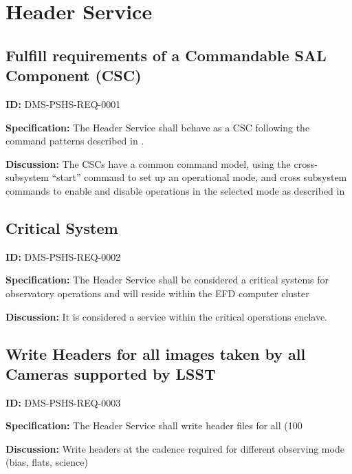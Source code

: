 \documentclass[SE,toc,lsstdraft]{lsstdoc}
\date{2018-06-07}
\begin{document}
\maketitle

\section{Header Service}

\subsection{Fulfill requirements of a Commandable SAL Component (CSC)}

\label{DMS-PSHS-REQ-0001}
\textbf{ID:} DMS-PSHS-REQ-0001

\textbf{Specification:}
The Header Service shall behave as a CSC following the command patterns described in .

\textbf{Discussion:}
The CSCs have a common command model, using the cross-subsystem “start” command to set up an operational mode, and cross subsystem commands to enable and disable operations in the selected mode as described in 

\subsection{Critical System}

\label{DMS-PSHS-REQ-0002}
\textbf{ID:} DMS-PSHS-REQ-0002

\textbf{Specification:}
The Header Service shall be considered a critical systems for observatory operations and will reside within the EFD computer cluster

\textbf{Discussion:}
It is considered a service within the critical operations enclave.

\subsection{Write Headers for all images taken by all Cameras supported by LSST}

\label{DMS-PSHS-REQ-0003}
\textbf{ID:} DMS-PSHS-REQ-0003

\textbf{Specification:}
The Header Service shall write header files for all (100%

\textbf{Discussion:}
Write headers at the cadence required for different observing mode (bias, flats, science)
\end{document}

